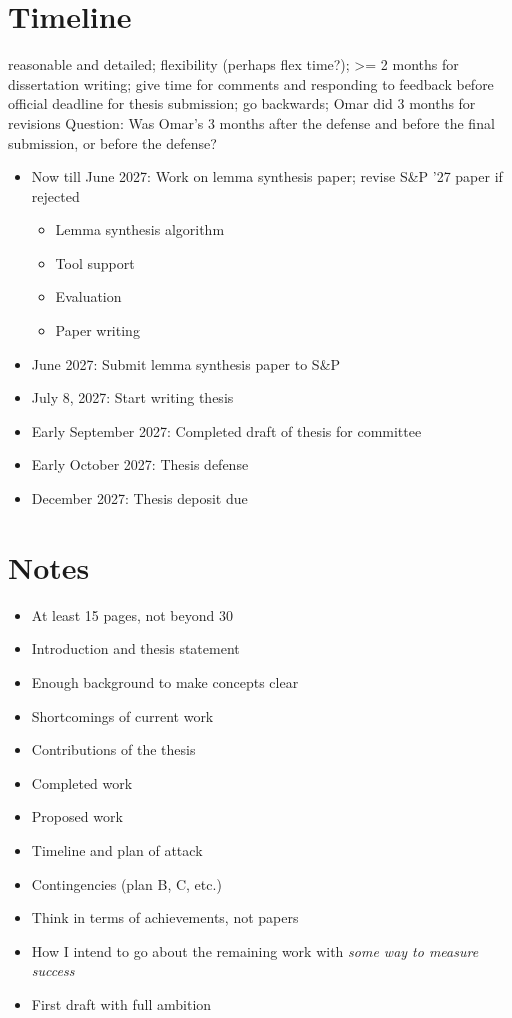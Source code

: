 \documentclass{article}
\theoremstyle{definition}
\begin{document}
\section{Timeline}
reasonable and detailed; flexibility (perhaps flex time?); >= 2 months for dissertation writing; give time for comments and responding to feedback before official deadline for thesis submission; go backwards; Omar did 3 months for revisions
Question: Was Omar's 3 months after the defense and before the final submission, or before the defense?
\begin{itemize}
  \item Now till June 2027: Work on lemma synthesis paper; revise S\&P '27 paper if rejected
  \begin{itemize}
    \item Lemma synthesis algorithm 
    \item Tool support 
    \item Evaluation
    \item Paper writing
  \end{itemize}
  \item June 2027: Submit lemma synthesis paper to S\&P
  \item July 8, 2027: Start writing thesis
  \item Early September 2027: Completed draft of thesis for committee
  \item Early October 2027: Thesis defense
  \item December 2027: Thesis deposit due
\end{itemize}

\section{Notes}

\begin{itemize}
  \item At least 15 pages, not beyond 30 
  
  \item Introduction and thesis statement
  \item Enough background to make concepts clear
  \item Shortcomings of current work
  \item Contributions of the thesis
  \item Completed work
  \item Proposed work
  \item Timeline and plan of attack
  \item Contingencies (plan B, C, etc.)
  \item Think in terms of achievements, not papers
  \item How I intend to go about the remaining work 
  with \emph{some way to measure success}
  \item First draft with full ambition
\end{itemize}



\end{document}
